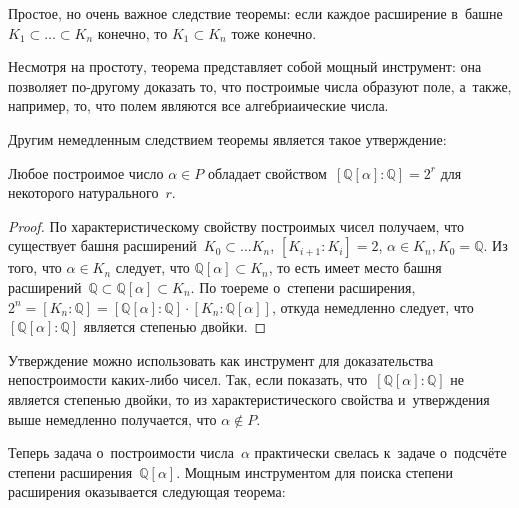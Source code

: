 \documentclass{article}
\begin{document}
\begin{remark}
  Простое, но очень важное следствие теоремы: если каждое расширение
  в~башне~$K_1 \subset \ldots \subset K_n$ конечно, то $K_1 \subset K_n$ тоже
  конечно.

  Несмотря на простоту, теорема представляет собой мощный инструмент: она
  позволяет по-другому доказать то, что построимые числа образуют поле, а~также,
  например, то, что полем являются все алгебриаические числа.
\end{remark}

Другим немедленным следствием теоремы является такое утверждение:

\begin{claim}
  Любое построимое число $\alpha \in P$ обладает
  свойством~$[\mathbb{Q}[\alpha]:\mathbb{Q}] = 2^r$ для некоторого
  натурального~$r$.
\end{claim}
\begin{proof}
  По характеристическому свойству построимых чисел получаем, что существует
  башня расширений~$K_0 \subset \ldots K_n$, $[K_{i+1}:K_i] = 2$, $\alpha \in
  K_n, K_0 = \mathbb{Q}$. Из того, что $\alpha \in K_n$ следует, что
  $\mathbb{Q}[\alpha] \subset K_n$, то есть имеет место башня
  расширений~$\mathbb{Q} \subset \mathbb{Q}[\alpha] \subset K_n$. По тоереме
  о~степени расширения, $2^n = [K_n:\mathbb{Q}] =
  [\mathbb{Q}[\alpha]:\mathbb{Q}] \cdot [K_n:\mathbb{Q}[\alpha]]$, откуда
  немедленно следует, что~$[\mathbb{Q}[\alpha]:\mathbb{Q}]$ является степенью
  двойки.
\end{proof}

\begin{remark}
  Утверждение можно использовать как инструмент для доказательства
  непостроимости каких-либо чисел. Так, если показать,
  что~$[\mathbb{Q}[\alpha]:\mathbb{Q}]$ не является степенью двойки, то
  из характеристического свойства и~утверждения выше немедленно получается, что
  $\alpha \notin P$.
\end{remark}

Теперь задача о~построимости числа~$\alpha$ практически свелась к~задаче
о~подсчёте степени расширения~$\mathbb{Q}[\alpha]$. Мощным инструментом для
поиска степени расширения оказывается следующая теорема:
\end{document}
